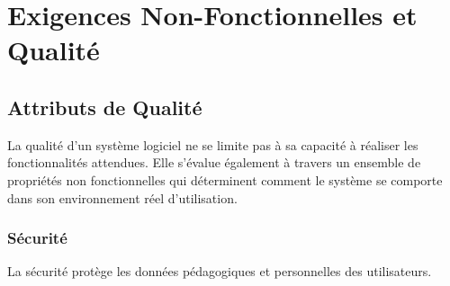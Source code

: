

\chapter{Exigences Non-Fonctionnelles et Qualité}

\section{Attributs de Qualité}

La qualité d'un système logiciel ne se limite pas à sa capacité à réaliser les fonctionnalités attendues. Elle s'évalue
également à travers un ensemble de propriétés non fonctionnelles
qui déterminent comment le système se comporte dans son environnement
réel d'utilisation.


\subsection{Sécurité}



La sécurité protège les données pédagogiques et personnelles des utilisateurs.

